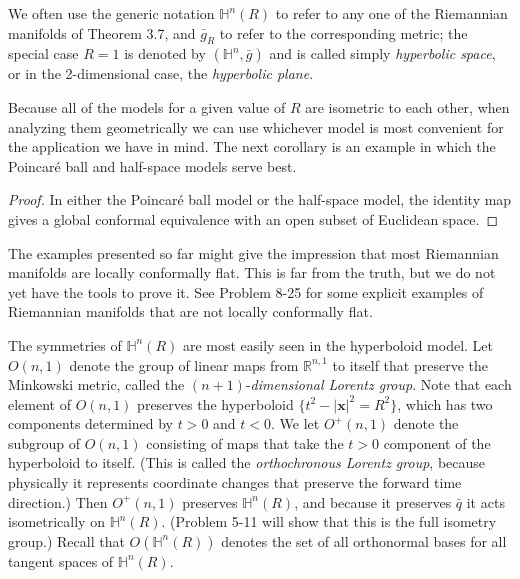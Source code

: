 We often use the generic notation $\mathbb{H}^n(R)$ to refer to any one of the Riemannian manifolds of Theorem 3.7, and $\bar{g}_R$ to refer to the corresponding metric; the special case $R=1$ is denoted by $(\mathbb{H}^n, \bar{g})$ and is called simply \emph{hyperbolic space}, or in the 2-dimensional case, the \emph{hyperbolic plane}.

Because all of the models for a given value of $R$ are isometric to each other, when analyzing them geometrically we can use whichever model is most convenient for the application we have in mind. The next corollary is an example in which the Poincaré ball and half-space models serve best.

\begin{corollary}
\label{cor:hyperbolic-locally-conformally-flat}
\end{corollary}

\begin{proof}
In either the Poincaré ball model or the half-space model, the identity map
gives a global conformal equivalence with an open subset of Euclidean space.
\end{proof}

The examples presented so far might give the impression that most Riemannian
manifolds are locally conformally flat. This is far from the truth, but we do not yet
have the tools to prove it. See Problem 8-25 for some explicit examples of Riemannian
manifolds that are not locally conformally flat.

The symmetries of $\mathbb{H}^n(R)$ are most easily seen in the hyperboloid model. Let
$O(n, 1)$ denote the group of linear maps from $\mathbb{R}^{n,1}$ to itself that preserve the
Minkowski metric, called the $(n + 1)$-\emph{dimensional Lorentz group}. Note that each
element of $O(n, 1)$ preserves the hyperboloid $\{t^2 - |\mathbf{x}|^2 = R^2\}$, which has two components
determined by $t > 0$ and $t < 0$. We let $O^+(n, 1)$ denote the subgroup
of $O(n, 1)$ consisting of maps that take the $t > 0$ component of the hyperboloid to
itself. (This is called the \emph{orthochronous Lorentz group}, because physically it represents
coordinate changes that preserve the forward time direction.) Then $O^+(n, 1)$
preserves $\mathbb{H}^n(R)$, and because it preserves $\bar{q}$ it acts isometrically on $\mathbb{H}^n(R)$.
(Problem 5-11 will show that this is the full isometry group.) Recall that $O(\mathbb{H}^n(R))$
denotes the set of all orthonormal bases for all tangent spaces of $\mathbb{H}^n(R)$.

